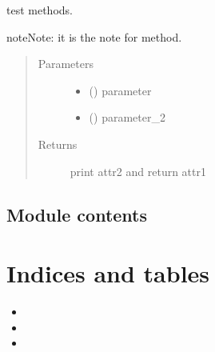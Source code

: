 \documentclass[letterpaper,10pt,dvipdfmx]{sphinxmanual}
\begin{document}
\begin{fulllineitems}

\begin{fulllineitems}
\label{\detokenize{test_lib:test_lib.TestClass.TestClass.method1}}
test methods.

\begin{sphinxadmonition}{note}{Note:}
it is the note for method.
\end{sphinxadmonition}
\begin{quote}\begin{description}
\item[{Parameters}] \leavevmode\begin{itemize}
\item {} 
 () \sphinxhyphen{}\sphinxhyphen{} parameter

\item {} 
 () \sphinxhyphen{}\sphinxhyphen{} parameter\_2

\end{itemize}

\item[{Returns}] \leavevmode
print attr2 and return attr1

\end{description}\end{quote}

\end{fulllineitems}


\end{fulllineitems}



\section{Module contents}
\label{\detokenize{test_lib:module-test_lib}}\label{\detokenize{test_lib:module-contents}}

\chapter{Indices and tables}
\label{\detokenize{index:indices-and-tables}}\begin{itemize}
\item {} 

\item {} 

\item {} 

\end{itemize}
\end{document}
